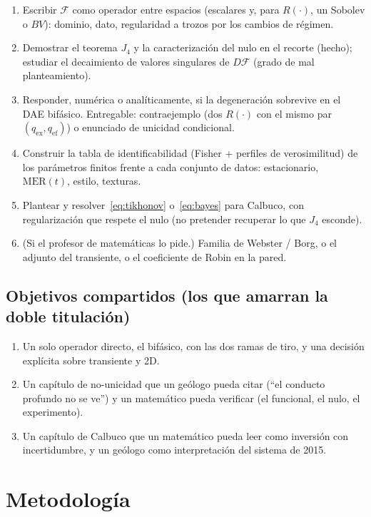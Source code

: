 \documentclass[11pt,a4paper]{article}
\theoremstyle{plain}
\theoremstyle{definition}
\theoremstyle{remark}
\newcommand{\MER}{\mathrm{MER}}
\newcommand{\F}{\mathcal{F}}
\begin{document}
\begin{enumerate}[label=M\arabic*.]
\item Escribir $\F$ como operador entre espacios (escalares y,
  para $R(\cdot)$, un Sobolev o $BV$): dominio, dato, regularidad
  a trozos por los cambios de régimen.
\item Demostrar el teorema $J_4$ y la caracterización del nulo en
  el recorte (hecho); estudiar el decaimiento de valores
  singulares de $D\F$ (grado de mal planteamiento).
\item Responder, numérica o analíticamente, si la degeneración
  sobrevive en el DAE bifásico. Entregable: contraejemplo
  (dos $R(\cdot)$ con el mismo par $(q_{\mathrm{ex}},q_{\mathrm{ef}})$)
  o enunciado de unicidad condicional.
\item Construir la tabla de identificabilidad (Fisher + perfiles
  de verosimilitud) de los parámetros finitos frente a cada
  conjunto de datos: estacionario, $\MER(t)$, estilo, texturas.
\item Plantear y resolver~\eqref{eq:tikhonov} o~\eqref{eq:bayes}
  para Calbuco, con regularización que respete el nulo (no
  pretender recuperar lo que $J_4$ esconde).
\item (Si el profesor de matemáticas lo pide.) Familia de Webster
  / Borg, o el adjunto del transiente, o el coeficiente de Robin
  en la pared.
\end{enumerate}

\subsection{Objetivos compartidos (los que amarran la doble titulación)}

\begin{enumerate}[label=C\arabic*.]
\item Un solo operador directo, el bifásico, con las dos ramas de
  tiro, y una decisión explícita sobre transiente y 2D.
\item Un capítulo de no-unicidad que un geólogo pueda citar
  (``el conducto profundo no se ve'') y un matemático pueda
  verificar (el funcional, el nulo, el experimento).
\item Un capítulo de Calbuco que un matemático pueda leer como
  inversión con incertidumbre, y un geólogo como interpretación
  del sistema de 2015.
\end{enumerate}

\section{Metodología}
\label{sec:metodo}
\end{document}

